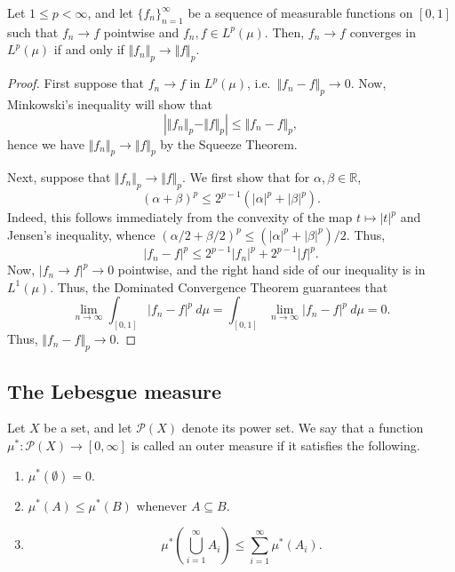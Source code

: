 \documentclass[11pt]{article}
\newcommand{\R}{\mathbb{R}}
\newcommand{\norm}[1]{\Vert #1 \Vert}
\theoremstyle{definition}
\theoremstyle{remark}
\numberwithin{equation}{section}
\begin{document}
    \begin{theorem}
        Let $1 \leq p < \infty$, and let $\{f_n\}_{n = 1}^\infty$ be a sequence of
        measurable functions on $[0, 1]$ such that $f_n \to f$ pointwise and $f_n, f
        \in L^p(\mu)$. Then, $f_n \to f$ converges in $L^p(\mu)$ if and only if
        $\norm{f_n}_p \to \norm{f}_p$.
    \end{theorem}
    \begin{proof}
        First suppose that $f_n \to f$ in $L^p(\mu)$, i.e.\ $\norm{f_n - f}_p \to 0$.
        Now, Minkowski's inequality will show that \[
            |\norm{f_n}_p - \norm{f}_p| \leq \norm{f_n - f}_p,
        \] hence we have $\norm{f_n}_p \to \norm{f}_p$ by the Squeeze Theorem.

        Next, suppose that $\norm{f_n}_p \to \norm{f}_p$. We first show that for
        $\alpha, \beta \in \R$, \[
            (\alpha + \beta)^p \leq 2^{p - 1}(|\alpha|^p + |\beta|^p).
        \] Indeed, this follows immediately from the convexity of the map $t \mapsto
        |t|^p$ and Jensen's inequality, whence $(\alpha / 2 + \beta / 2)^p \leq
        (|\alpha|^p + |\beta|^p) / 2$. Thus, \[
            |f_n - f|^p \leq 2^{p - 1}|f_n|^p + 2^{p - 1}|f|^p.
        \] Now, $|f_n \to f|^p \to 0$ pointwise, and the right hand side of our
        inequality is in $L^1(\mu)$. Thus, the Dominated Convergence Theorem
        guarantees that \[
            \lim_{n \to \infty} \int_{[0, 1]} |f_n - f|^p\:d\mu = \int_{[0, 1]}
            \lim_{n \to \infty} |f_n - f|^p\:d\mu = 0.
        \] Thus, $\norm{f_n - f}_p \to 0$.
    \end{proof}


    \subsection{The Lebesgue measure}

    \begin{definition}
        Let $X$ be a set, and let $\mathcal{P}(X)$ denote its power set. We say that
        a function $\mu^*\colon \mathcal{P}(X) \to [0, \infty]$ is called an outer
        measure if it satisfies the following.
        \begin{enumerate}
            \itemsep0em
            \item $\mu^*(\emptyset) = 0$.
            \item $\mu^*(A) \leq \mu^*(B)$ whenever $A \subseteq B$.
            \item \[
                \mu^*\left(\bigcup_{i = 1}^\infty A_i\right) \leq \sum_{i = 1}^\infty
                \mu^*(A_i).
            \]
        \end{enumerate}
    \end{definition}
\end{document}

